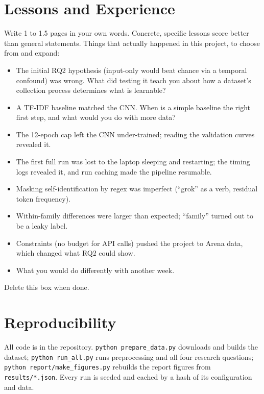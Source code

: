 \documentclass[11pt]{article}
\begin{document}
\section{Lessons and Experience}
\begin{tcolorbox}[colback=red!4,colframe=red!60,title=\textbf{TODO: write this section yourself (20\% of the grade)}]
\small Write 1 to 1.5 pages in your own words. Concrete, specific lessons score better than general statements. Things that actually happened in this project, to choose from and expand:
\begin{itemize}
  \item The initial RQ2 hypothesis (input-only would beat chance via a temporal confound) was wrong. What did testing it teach you about how a dataset's collection process determines what is learnable?
  \item A TF-IDF baseline matched the CNN. When is a simple baseline the right first step, and what would you do with more data?
  \item The 12-epoch cap left the CNN under-trained; reading the validation curves revealed it.
  \item The first full run was lost to the laptop sleeping and restarting; the timing logs revealed it, and run caching made the pipeline resumable.
  \item Masking self-identification by regex was imperfect (``grok'' as a verb, residual token frequency).
  \item Within-family differences were larger than expected; ``family'' turned out to be a leaky label.
  \item Constraints (no budget for API calls) pushed the project to Arena data, which changed what RQ2 could show.
  \item What you would do differently with another week.
\end{itemize}
Delete this box when done.
\end{tcolorbox}

\section{Reproducibility}
All code is in the repository. \texttt{python prepare\_data.py} downloads and builds the dataset; \texttt{python run\_all.py} runs preprocessing and all four research questions; \texttt{python report/make\_figures.py} rebuilds the report figures from \texttt{results/*.json}. Every run is seeded and cached by a hash of its configuration and data.
\end{document}
